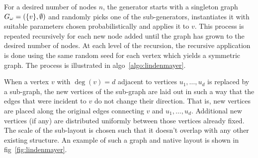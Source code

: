 \documentclass{graphstudy}
\begin{document}
For a desired number of nodes \(n\), the  generator starts with a singleton graph
\(G_\omega=(\{v\},\emptyset)\) and randomly picks one of the sub-generators, instantiates it with suitable
parameters chosen probabilistically and applies it to \(v\).  This process is repeated recursively for each new node
added until the graph has grown to the desired number of nodes.  At each level of the recursion, the recursive
application is done using the same random seed for each vertex which yields a symmetric graph.  The process is
illustrated in \acl{algo}~\ref{algo:lindenmayer}.

When a vertex \(v\) with \(\deg(v)=d\) adjacent to vertices \(u_1,\ldots,u_d\) is replaced by a sub-graph, the new
vertices of the sub-graph are laid out in such a way that the edges that were incident to \(v\) do not change their
direction.  That is, new vertices are placed along the original edges connecting \(v\) and \(u_1,\ldots,u_d\).
Additional new vertices (if any) are distributed uniformly between those vertices already fixed.  The scale of the
sub-layout is chosen such that it doesn't overlap with any other existing structure.  An example of such a graph and
native layout is shown in \acl{fig}~\ref{fig:lindenmayer}.
\end{document}
